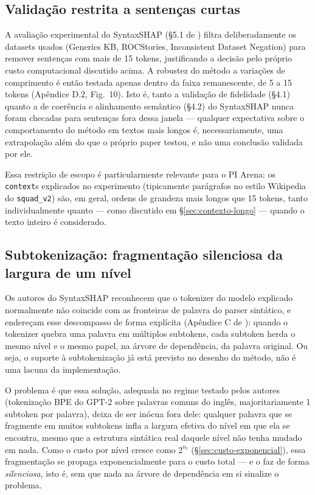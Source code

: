 \documentclass{article}
\begin{document}
\subsection{Validação restrita a sentenças curtas}
\label{sec:sentencas-curtas}

A avaliação experimental do SyntaxSHAP (\S5.1 de \cite{amara2024syntaxshap}) filtra deliberadamente os datasets usados (Generics KB, ROCStories, Inconsistent Dataset Negation) para remover sentenças com mais de 15 tokens, justificando a decisão pelo próprio custo computacional discutido acima. A robustez do método a variações de comprimento é então testada apenas dentro da faixa remanescente, de 5 a 15 tokens (Apêndice D.2, Fig.\ 10). Isto é, tanto a validação de fidelidade (\S4.1) quanto a de coerência e alinhamento semântico (\S4.2) do SyntaxSHAP nunca foram checadas para sentenças fora dessa janela — qualquer expectativa sobre o comportamento do método em textos mais longos é, necessariamente, uma extrapolação além do que o próprio paper testou, e não uma conclusão validada por ele.

Essa restrição de escopo é particularmente relevante para o PI Arena: os \texttt{context}s explicados no experimento (tipicamente parágrafos no estilo Wikipedia do \texttt{squad\_v2}) são, em geral, ordens de grandeza mais longos que 15 tokens, tanto individualmente quanto — como discutido em \S\ref{sec:contexto-longo} — quando o texto inteiro é considerado.

\subsection{Subtokenização: fragmentação silenciosa da largura de um nível}
\label{sec:subtokenizacao}

Os autores do SyntaxSHAP reconhecem que o tokenizer do modelo explicado normalmente não coincide com as fronteiras de palavra do parser sintático, e endereçam esse descompasso de forma explícita (Apêndice C de \cite{amara2024syntaxshap}): quando o tokenizer quebra uma palavra em múltiplos subtokens, cada subtoken herda o mesmo nível e o mesmo papel, na árvore de dependência, da palavra original. Ou seja, o suporte à subtokenização já está previsto no desenho do método, não é uma lacuna da implementação.

O problema é que essa solução, adequada no regime testado pelos autores (tokenização BPE do GPT-2 sobre palavras comuns do inglês, majoritariamente 1 subtoken por palavra), deixa de ser inócua fora dele: qualquer palavra que se fragmente em muitos subtokens infla a largura efetiva do nível em que ela se encontra, mesmo que a estrutura sintática real daquele nível não tenha mudado em nada. Como o custo por nível cresce como $2^{n_l}$ (\S\ref{sec:custo-exponencial}), essa fragmentação se propaga exponencialmente para o custo total — e o faz de forma \emph{silenciosa}, isto é, sem que nada na árvore de dependência em si sinalize o problema.
\end{document}
